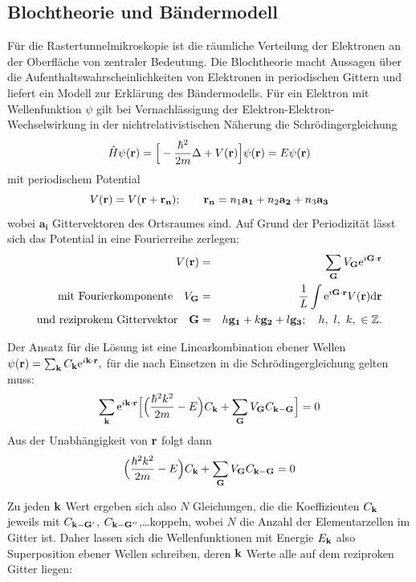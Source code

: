 \subsection{Blochtheorie und Bändermodell}

Für die Rastertunnelmikroskopie ist die räumliche Verteilung der Elektronen an 
der Oberfläche von zentraler Bedeutung. Die Blochtheorie macht Aussagen über 
die Aufenthaltswahrscheinlichkeiten von Elektronen in periodischen 
Gittern und liefert ein Modell zur Erklärung des Bändermodells. 
Für ein Elektron mit Wellenfunktion $\psi$ gilt bei Vernachlässigung der 
Elektron-Elektron-Wechselwirkung in der nichtrelativistischen Näherung die 
Schrödingergleichung 
\begin{equation}
    \hat H \psi(\mathbf{r}) = \Big[ - \frac{\hbar^2}{2m} \Delta + V(\mathbf{r}) \Big] \psi(\mathbf{r}) = E \psi(\mathbf{r})
\end{equation}
mit periodischem Potential
\begin{equation}
    V(\mathbf{r}) = V(\mathbf{r + r_n}); 
\qquad \mathbf{r_n} = n_1 \mathbf{a_1} + n_2 \mathbf{a_2} + n_3 \mathbf{a_3} 
\end{equation}
wobei $\mathbf{a_i}$ Gittervektoren des Ortsraumes sind. Auf Grund der Periodizität lässt 
sich das Potential in eine Fourierreihe zerlegen:
\begin{eqnarray}
    V(\mathbf{r}) &= &\sum_{\mathbf{G}} V_{\mathbf{G}} \mathrm{e}^{i\mathbf{G} \cdot \mathbf{r}} \\
    \mathrm{mit \ Fourierkomponente \quad}  V_{\mathbf{G}} &= &\frac{1}{L} \int \mathrm{e}^{i\mathbf{G} \cdot \mathbf{r}} 
    V(\mathbf{r}) \mathrm{d}\mathbf{r}  \nonumber \\
    \mathrm{und \ reziprokem \ Gittervektor \quad} \mathbf{G} &= &h\mathbf{g_1} + k\mathbf{g_2} +l\mathbf{g_3}; 
    \quad h, \ l, \ k, \ \in \mathbb{Z}. \nonumber
\end{eqnarray}

Der Ansatz für die Lösung ist eine Linearkombination ebener Wellen
$ \psi(\mathbf{r}) = \sum_{\mathbf{k}} C_{\mathbf{k}} \mathrm{e}^{i\mathbf{k} \cdot \mathbf{r}}, $
für die nach Einsetzen in die Schrödingergleichung gelten muss:
\begin{equation}
    \sum_{\mathbf{k}} \mathrm{e}^{i\mathbf{k} \cdot \mathbf{r}} 
    \Big[ \Big( \frac{\hbar^2 k^2}{2m} - E\Big) C_{\mathbf{k}} + \sum_{\mathbf{G}} V_{\mathbf{G}} C_{\mathbf{k} - \mathbf{G}}\Big] 
    = 0
\end{equation}
Aus der Unabhängigkeit von $\mathbf{r}$ folgt dann
\begin{equation}
    \Big( \frac{\hbar^2 k^2}{2m} - E\Big) C_{\mathbf{k}} + \sum_{\mathbf{G}} V_{\mathbf{G}} C_{\mathbf{k} - \mathbf{G}}= 0
\end{equation}

Zu jeden $\mathbf{k}$ Wert ergeben sich also $N$ Gleichungen, die die Koeffizienten
$C_{\mathbf{k}}$ jeweils mit $C_{\mathbf{k} - \mathbf{G}'}$, $C_{\mathbf{k} - \mathbf{G}''}$,\ldots  koppeln, wobei $N$ die Anzahl 
der Elementarzellen im Gitter ist. Daher lassen sich die Wellenfunktionen 
mit Energie $E_{\mathbf{k}}$ also Superposition ebener Wellen schreiben, deren $\mathbf{k}$ Werte 
alle auf dem reziproken Gitter liegen: 

